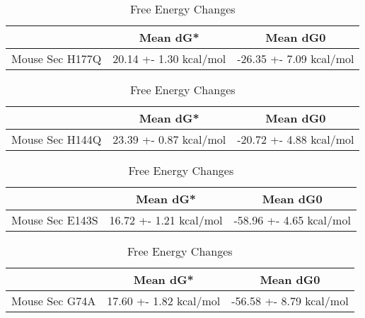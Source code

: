                      
                \begin{table}[ht]
                  \centering
                  \begin{tabular}{|c|c|c|}
                  \hline
                    & Mean dG* & Mean dG0 \\
                  \hline
                  Mouse Sec H177Q & 20.14 +- 1.30 kcal/mol & -26.35 +- 7.09 kcal/mol \\
                  \hline
                  \end{tabular}
                  \caption{Free Energy Changes}
                  \end{table}
                  

                    \begin{table}[ht]
                        \centering
                        \begin{tabular}{|c|c|c|}
                        \hline
                          & Mean dG* & Mean dG0 \\
                        \hline
                        Mouse Sec H144Q & 23.39 +- 0.87 kcal/mol & -20.72 +- 4.88 kcal/mol \\
                        \hline
                        \end{tabular}
                        \caption{Free Energy Changes}
                        \end{table}
                   

                        \begin{table}[ht]
                          \centering
                          \begin{tabular}{|c|c|c|}
                          \hline
                            & Mean dG* & Mean dG0 \\
                          \hline
                          Mouse Sec  E143S & 16.72 +- 1.21 kcal/mol & -58.96 +- 4.65 kcal/mol \\
                          \hline
                          \end{tabular}
                          \caption{Free Energy Changes}
                          \end{table}
                   

                          \begin{table}[ht]
                            \centering
                            \begin{tabular}{|c|c|c|}
                            \hline
                              & Mean dG* & Mean dG0 \\
                            \hline
                            Mouse Sec G74A & 17.60 +- 1.82 kcal/mol & -56.58 +- 8.79 kcal/mol \\
                            \hline
                            \end{tabular}
                            \caption{Free Energy Changes}
                            \end{table}



